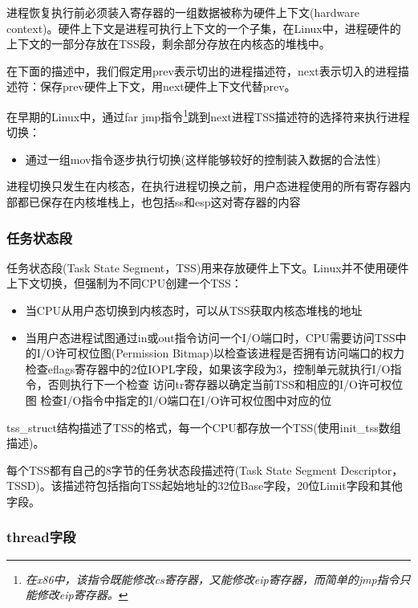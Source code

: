     进程恢复执行前必须装入寄存器的一组数据被称为硬件上下文(hardware context)。硬件上下文是进程可执行上下文的一个子集，在Linux中，进程硬件的上下文的一部分存放在TSS段，剩余部分存放在内核态的堆栈中。

    在下面的描述中，我们假定用prev表示切出的进程描述符，next表示切入的进程描述符：保存prev硬件上下文，用next硬件上下文代替prev。

    在早期的Linux中，通过far jmp指令\footnote[1]{\emph{在x86中，该指令既能修改cs寄存器，又能修改eip寄存器，而简单的jmp指令只能修改eip寄存器。}}跳到next进程TSS描述符的选择符来执行进程切换：

\begin{itemize}
    \item 通过一组mov指令逐步执行切换(这样能够较好的控制装入数据的合法性)
\end{itemize}

    进程切换只发生在内核态，在执行进程切换之前，用户态进程使用的所有寄存器内部都已保存在内核堆栈上，也包括ss和esp这对寄存器的内容

\subsubsection{任务状态段}

    任务状态段(Task State Segment，TSS)用来存放硬件上下文。Linux并不使用硬件上下文切换，但强制为不同CPU创建一个TSS：

\begin{itemize}
    \item 当CPU从用户态切换到内核态时，可以从TSS获取内核态堆栈的地址
    \item 当用户态进程试图通过in或out指令访问一个I/O端口时，CPU需要访问TSS中的I/O许可权位图(Permission Bitmap)以检查该进程是否拥有访问端口的权力
    \subitem 检查eflags寄存器中的2位IOPL字段，如果该字段为3，控制单元就执行I/O指令，否则执行下一个检查
    \subitem 访问tr寄存器以确定当前TSS和相应的I/O许可权位图
    \subitem 检查I/O指令中指定的I/O端口在I/O许可权位图中对应的位
\end{itemize}

    tss\_struct结构描述了TSS的格式，每一个CPU都存放一个TSS(使用init\_tss数组描述)。

    每个TSS都有自己的8字节的任务状态段描述符(Task State Segment Descriptor， TSSD)。该描述符包括指向TSS起始地址的32位Base字段，20位Limit字段和其他字段。

\subsubsection{thread字段}

